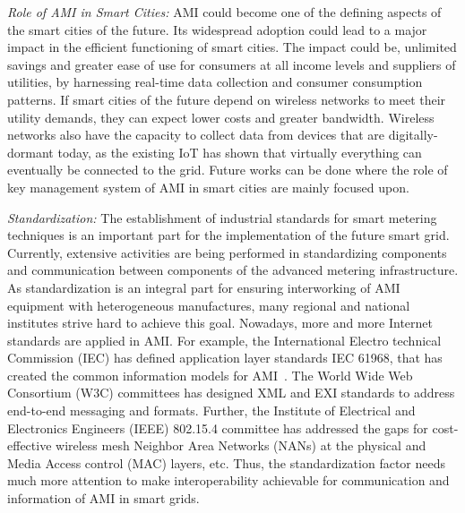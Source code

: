 \textit{Role of AMI in Smart Cities:} AMI could become one of the defining aspects of the smart cities of the future. Its widespread adoption could lead to a major impact in the efficient functioning of smart cities. The impact could be, unlimited savings and greater ease of use for consumers at all income levels and suppliers of utilities, by harnessing real-time data collection and consumer consumption patterns. If smart cities of the future depend on wireless networks to meet their utility demands, they can expect lower costs and greater bandwidth. Wireless networks also have the capacity to collect data from devices that are digitally-dormant today, as the existing IoT has shown that virtually everything can eventually be connected to the grid. Future works can be done where the role of key management system of AMI in smart cities are mainly focused upon.  

\textit{Standardization:} The establishment of industrial standards for smart metering techniques is an important part for the implementation of the future smart grid. Currently, extensive activities are being performed in standardizing components and communication between components of the advanced metering infrastructure. As standardization is an integral part for ensuring interworking of AMI equipment with heterogeneous manufactures, many regional and national institutes strive hard to achieve this goal. Nowadays, more and more Internet standards are applied in AMI. For example, the International Electro technical Commission (IEC) has defined application layer standards IEC 61968, that has created the common information models for AMI~\cite{Uslar}. The World Wide Web Consortium (W3C) committees has designed XML and EXI standards to address end-to-end messaging and formats. Further, the Institute of Electrical and Electronics Engineers (IEEE) 802.15.4 committee has addressed the gaps for cost-effective wireless mesh Neighbor Area Networks (NANs) at the physical and Media Access control (MAC) layers, etc. Thus, the standardization factor needs much more attention to make interoperability achievable for communication and information of AMI in smart grids.  

